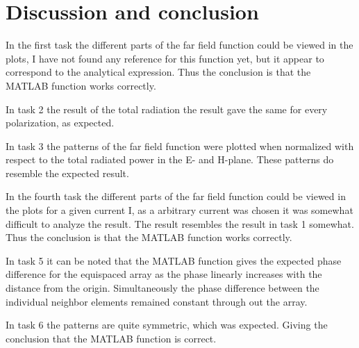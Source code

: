  \chapter{Discussion and conclusion}
 \label{chapter:discussion}
 

 In the first task the different parts of the far field function could be viewed in the plots, I have not found any reference for this function yet, but it appear to correspond to the analytical expression. Thus the conclusion is that the MATLAB function works correctly. 
 
 
 In task 2 the result of the total radiation the result gave the same for every polarization, as expected. 
 
 
In task 3 the patterns of the far field function were plotted when normalized with respect to the total radiated power in the E- and H-plane. These patterns do resemble the expected result.
 
 
 
 In the fourth task the different parts of the far field function could be viewed in the plots for a given current I, as a arbitrary current was chosen it was somewhat difficult to analyze the result. The result resembles the result in task 1 somewhat. Thus the conclusion is that the MATLAB function works correctly.
 
In task 5 it can be noted that the MATLAB function gives the expected phase difference for the equispaced 
 array as the phase linearly increases with the distance from the origin. Simultaneously the phase difference between the individual neighbor elements remained constant through out the array. 
 
 In task 6 the patterns are quite symmetric, which was expected. Giving the conclusion that the MATLAB function is correct. 